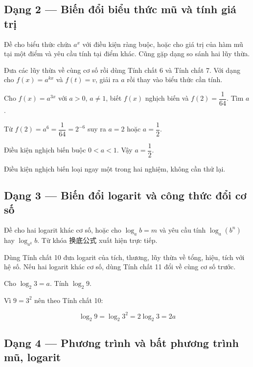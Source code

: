 \documentclass[11pt, a4paper]{article}
\begin{document}
\subsection{Dạng 2 — Biến đổi biểu thức mũ và tính giá trị}

 Đề cho biểu thức chứa $a^x$ với điều kiện ràng buộc, hoặc cho giá trị của hàm mũ tại một điểm và yêu cầu tính tại điểm khác. Cũng gặp dạng so sánh hai lũy thừa.

 Đưa các lũy thừa về cùng cơ số rồi dùng Tính chất 6 và Tính chất 7. Với dạng cho $f(x) = a^{kx}$ và $f(t) = v$, giải ra $a$ rồi thay vào biểu thức cần tính.

\begin{vidu}[{2}]
Cho $f(x) = a^{3x}$ với $a > 0$, $a \neq 1$, biết $f(x)$ nghịch biến và $f(2) = \dfrac{1}{64}$. Tìm $a$.

Từ $f(2) = a^6 = \dfrac{1}{64} = 2^{-6}$ suy ra $a = 2$ hoặc $a = \dfrac{1}{2}$.

Điều kiện nghịch biến buộc $0 < a < 1$. Vậy $a = \dfrac{1}{2}$.

 Điều kiện nghịch biến loại ngay một trong hai nghiệm, không cần thử lại.

\end{vidu}
\subsection{Dạng 3 — Biến đổi logarit và công thức đổi cơ số}

 Đề cho hai logarit khác cơ số, hoặc cho $\log_a b = m$ và yêu cầu tính $\log_a (b^n)$ hay $\log_{a^k} b$. Từ khóa 换底公式 xuất hiện trực tiếp.

 Dùng Tính chất 10 đưa logarit của tích, thương, lũy thừa về tổng, hiệu, tích với hệ số. Nếu hai logarit khác cơ số, dùng Tính chất 11 đổi về cùng cơ số trước.

\begin{vidu}[{3}]
Cho $\log_2 3 = a$. Tính $\log_2 9$.

Vì $9 = 3^2$ nên theo Tính chất 10:

$$\log_2 9 = \log_2 3^2 = 2\log_2 3 = 2a$$

\end{vidu}
\subsection{Dạng 4 — Phương trình và bất phương trình mũ, logarit}
\end{document}
